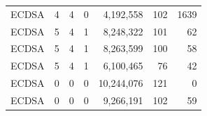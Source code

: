\begin{table}[]
\begin{threeparttable}
\begin{tabular}{l@{}r@{~~}rrr@{~~}rr}
        ECDSA\tnote{3}              &   4                   &   4                 & 0                    &  4,192,558    & 102   & 1639          \\   
        ECDSA\tnote{4}              &  5                    & 4                   & 1                    &  8,248,322       & 101     & 62           \\   
        ECDSA\tnote{5}              &  5                    & 4                   & 1                    &  8,263,599      & 100     & 58            \\   
        ECDSA\tnote{6}              &  5                    & 4                   & 1                    &  6,100,465       & 76      & 42                  \\  
        ECDSA\tnote{7}              & 0                      &  0                   &    0               &  10,244,076       &  121     & 0                  \\  
        ECDSA\tnote{8}              & 0                      &  0                   &  0                 &  9,266,191          & 102     & 59        \\  



\end{tabular}
\end{threeparttable}
\end{table}
